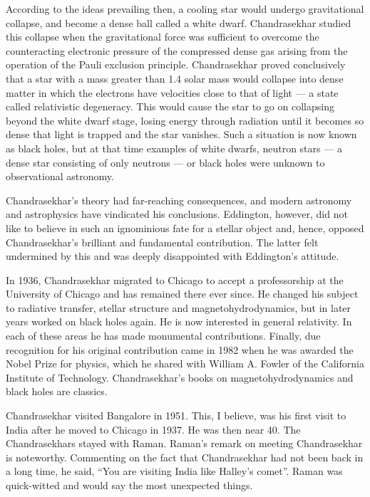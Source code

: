 According to the ideas prevailing then, a cooling star would
undergo gravitational collapse, and become a dense ball called
a white dwarf. Chandrasekhar studied this collapse when the
gravitational force was sufficient to overcome the counteracting
electronic pressure of the compressed dense gas arising from the
operation of the Pauli exclusion principle. Chandrasekhar proved
conclusively that a star with a mass greater than 1.4 solar mass
would collapse into dense matter in which the electrons have
velocities close to that of light --- a state called relativistic
degeneracy. This would cause the star to go on collapsing beyond
the white dwarf stage, losing energy through radiation until it
becomes so dense that light is trapped and the star vanishes.
Such a situation is now known as black holes, but at that time
examples of white dwarfs, neutron stars --- a dense star consisting
of only neutrons --- or black holes were unknown to observational
astronomy.

Chandrasekhar's theory had far-reaching consequences, and
modern astronomy and astrophysics have vindicated his
conclusions. Eddington, however, did not like to believe in
such an ignominious fate for a stellar object and, hence, opposed
Chandrasekhar's brilliant and fundamental contribution. The
latter felt undermined by this and was deeply disappointed with
Eddington's attitude.

In 1936, Chandrasekhar migrated to Chicago to accept a
professorship at the University of Chicago and has remained there
ever since. He changed his subject to radiative transfer, stellar
structure and magnetohydrodynamics, but in later years worked
on black holes again. He is now interested in general relativity.
In each of these areas he has made monumental contributions.
Finally, due recognition for his original contribution came in 1982
when he was awarded the Nobel Prize for physics, which he shared
with William A. Fowler of the California Institute of Technology.
Chandrasekhar's books on magnetohydrodynamics and black
holes are classics.

Chandrasekhar visited Bangalore in 1951. This, I believe,
was his first visit to India after he moved to Chicago in 1937.
He was then near 40. The Chandrasekhars stayed with Raman.
Raman's remark on meeting Chandrasekhar is noteworthy.
Commenting on the fact that Chandrasekhar had not been back
in a long time, he said, ``You are visiting India like Halley's
comet''. Raman was quick-witted and would say the most
unexpected things.

